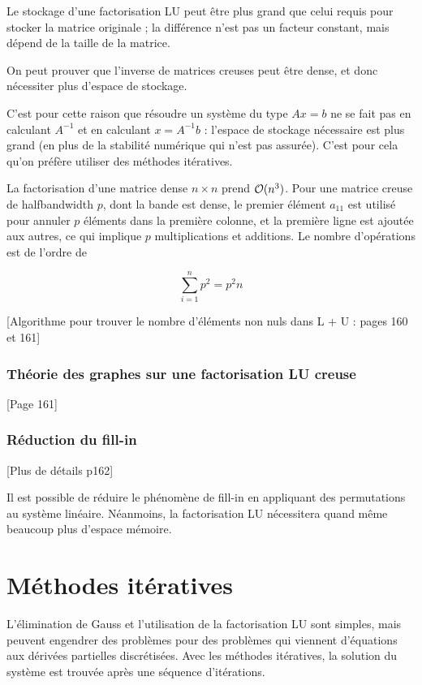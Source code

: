 		Le stockage d'une factorisation LU peut être plus grand que celui requis pour stocker la matrice originale ; la différence n'est pas un facteur constant, mais dépend de la taille de la matrice.
		
		On peut prouver que l'inverse de matrices creuses peut être dense, et donc nécessiter plus d'espace de stockage.
		
		C'est pour cette raison que résoudre un système du type $Ax = b$ ne se fait pas en calculant $A^{-1}$ et en calculant $x = A^{-1} b$ : l'espace de stockage nécessaire est plus grand (en plus de la stabilité numérique qui n'est pas assurée). C'est pour cela qu'on préfère utiliser des méthodes itératives.
		
		La factorisation d'une matrice dense $n \times n$ prend $\mathcal{O} (n^3)$. Pour une matrice creuse de halfbandwidth $p$, dont la bande est dense, le premier élément $a_{11}$ est utilisé pour annuler $p$ éléments dans la première colonne, et la première ligne est ajoutée aux autres, ce qui implique $p$ multiplications et additions. Le nombre d'opérations est de l'ordre de
		
		$$\sum_{i = 1}^n p^2 = p^2n$$
		
		[Algorithme pour trouver le nombre d'éléments non nuls dans L + U : pages 160 et 161]
		
		\subsubsection{Théorie des graphes sur une factorisation LU creuse}
		
		[Page 161]
		
		\subsubsection{Réduction du fill-in}
		
		[Plus de détails p162]
		
		Il est possible de réduire le phénomène de fill-in en appliquant des permutations au système linéaire. Néanmoins, la factorisation LU nécessitera quand même beaucoup plus d'espace mémoire.
		
		

\section{Méthodes itératives}

L'élimination de Gauss et l'utilisation de la factorisation LU sont simples, mais peuvent engendrer des problèmes pour des problèmes qui viennent d'équations aux dérivées partielles discrétisées. Avec les méthodes itératives, la solution du système est trouvée après une séquence d'itérations.

